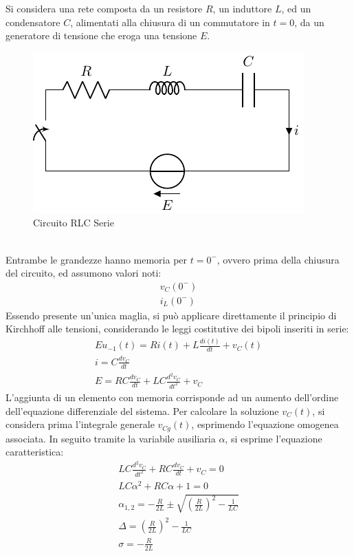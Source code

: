 \documentclass{article}
\numberwithin{equation}{subsection}
\begin{document}
Si considera una rete composta da un resistore $R$, un induttore $L$, ed un condensatore $C$, alimentati alla chiusura di un commutatore in $t=0$, da un generatore 
di tensione che eroga una tensione $E$.
\begin{figure}[ht]%
    \centering
    \includegraphics{circuito-rlc-serie.pdf}
    \caption{Circuito RLC Serie}
    \label{fig:circuito-rlc-serie}
\end{figure}
\\
Entrambe le grandezze hanno memoria per $t=0^-$, ovvero prima della chiusura del circuito, ed assumono valori noti: 
\begin{gather*}
    v_C(0^-)\\
    i_L(0^-)
\end{gather*}
Essendo presente un'unica maglia, si può applicare direttamente il principio di Kirchhoff alle tensioni, considerando le leggi costitutive dei bipoli inseriti in serie:
\begin{gather*}
    Eu_{-1}(t)=Ri(t)+\displaystyle L\frac{di(t)}{dt}+v_C(t)\\
    i=\displaystyle C\frac{dv_C}{dt}\\
    E=RC\displaystyle\frac{dv_C}{dt}+LC\frac{d^2v_C}{dt^2}+v_C
\end{gather*}
L'aggiunta di un elemento con memoria corrisponde ad un aumento dell'ordine dell'equazione differenziale del sistema. 
Per calcolare la soluzione $v_C(t)$, si considera prima l'integrale generale $v_{Cg}(t)$, esprimendo l'equazione omogenea associata. In seguito tramite la variabile ausiliaria 
$\alpha$, si esprime l'equazione caratteristica:
\begin{gather*}
    LC\frac{d^2v_C}{dt^2}+RC\displaystyle\frac{dv_C}{dt}+v_C=0\\
    LC\alpha^2+RC\alpha+1=0\\
    \alpha_{1,2}=\displaystyle-\frac{R}{2L}\pm\sqrt{\left(\frac{R}{2L}\right)^2-\frac{1}{LC}}\\
    \Delta=\displaystyle\left(\frac{R}{2L}\right)^2-\frac{1}{LC}\\
    \sigma=\displaystyle-\frac{R}{2L}
\end{gather*}
\end{document}
